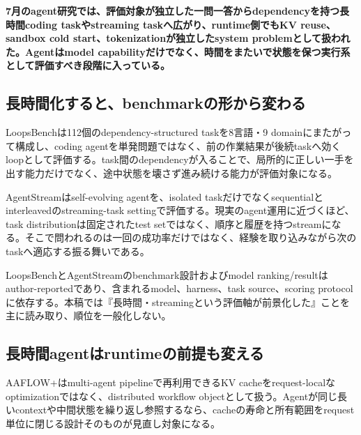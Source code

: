 \noindent\textbf{7月のagent研究では、評価対象が独立した一問一答からdependencyを持つ長時間coding taskやstreaming taskへ広がり、runtime側でもKV reuse、sandbox cold start、tokenizationが独立したsystem problemとして扱われた。Agentはmodel capabilityだけでなく、時間をまたいで状態を保つ実行系として評価すべき段階に入っている。}\autocite{src-30d9d574d4a1,src-4051106eaef3,src-4141dfcd9b12}

\par\medskip
\subsection{長時間化すると、benchmarkの形から変わる}

LoopsBenchは112個のdependency-structured taskを8言語・9 domainにまたがって構成し、coding agentを単発問題ではなく、前の作業結果が後続taskへ効くloopとして評価する。task間のdependencyが入ることで、局所的に正しい一手を出す能力だけでなく、途中状態を壊さず進み続ける能力が評価対象になる。\autocite{src-4141dfcd9b12}


AgentStreamはself-evolving agentを、isolated taskだけでなくsequentialとinterleavedのstreaming-task settingで評価する。現実のagent運用に近づくほど、task distributionは固定されたtest setではなく、順序と履歴を持つstreamになる。そこで問われるのは一回の成功率だけではなく、経験を取り込みながら次のtaskへ適応する振る舞いである。\autocite{src-30d9d574d4a1}


\begin{claimboundary}
LoopsBenchとAgentStreamのbenchmark設計およびmodel ranking/resultはauthor-reportedであり、含まれるmodel、harness、task source、scoring protocolに依存する。本稿では『長時間・streamingという評価軸が前景化した』ことを主に読み取り、順位を一般化しない。\autocite{src-30d9d574d4a1,src-4141dfcd9b12}
\end{claimboundary}

\par\medskip
\subsection{長時間agentはruntimeの前提も変える}

AAFLOW+はmulti-agent pipelineで再利用できるKV cacheをrequest-localなoptimizationではなく、distributed workflow objectとして扱う。Agentが同じ長いcontextや中間状態を繰り返し参照するなら、cacheの寿命と所有範囲をrequest単位に閉じる設計そのものが見直し対象になる。\autocite{src-4051106eaef3}


